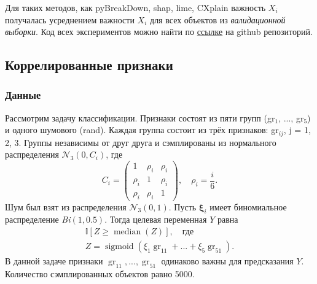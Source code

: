 \documentclass[12pt]{article}
\begin{document}
Для таких методов, как pyBreakDown, shap, lime, CXplain важность $X_i$ получалась усреднением важности $X_i$ для всех объектов из \emph{валидационной выборки}. Код всех экспериментов можно найти по \href{https://github.com/MikhailKuz/3_course_diary/tree/master/experiments}{ссылке} на github репозиторий.


\subsection{Коррелированные признаки}\label{corr_expir}
\subsubsection{Данные}
Рассмотрим задачу классификации. Признаки состоят из пяти групп (gr$_1$, ..., gr$_5$) и одного шумового (rand). Каждая группа состоит из трёх признаков: gr$_{ij}$, j = 1, 2, 3. Группы независимы от друг друга и сэмплированы из нормального распределения $\mathcal{N}_{3}\left(0, C_{i}\right)$, где 
\begin{equation*}
    C_{i}=\left(\begin{array}{ccc}
1 & \rho_{i} & \rho_{i} \\
\rho_{i} & 1 & \rho_{i} \\
\rho_{i} & \rho_{i} & 1
\end{array}\right)
, \hspace{1em} \rho_{i} = \frac{i}{6}.
\end{equation*}
Шум был взят из распределения $\mathcal{N}_{3}\left(0, 1\right)$. Пусть $\boldsymbol{\xi}_i$ имеет биномиальное распределение \emph{Bi}$(1, 0.5)$. 
\newpage
Тогда целевая переменная $Y$ равна
\begin{gather*}
    \mathbb{I}[Z \geq \operatorname{median}(Z)], \hspace{1em}\text{где} \\
    Z = \operatorname{sigmoid}(\xi_1 \operatorname{gr}_{11} + ... + \xi_5 \operatorname{gr}_{51}).
\end{gather*}
В данной задаче признаки $\operatorname{gr}_{11}, ..., \operatorname{gr}_{51}$ одинаково важны для предсказания $Y$. Количество сэмплированных объектов равно 5000.
\end{document}
